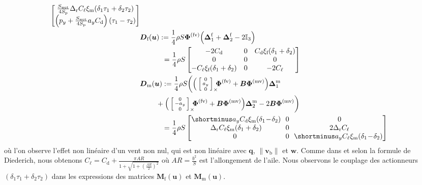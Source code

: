 \begin{align}
\begin{bmatrix}
   \frac{S_{\text{wet}}}{4S_{\text{p}}} \Delta_{\text{r}}C_{\ell}\xi_{\text{m}}(\delta_{1}\tau_{1} + \delta_{2}\tau_{2}) \\
   \left(p_{y}+\frac{S_{\text{wet}}}{4S_{\text{p}}} a_{y} C_{\text{d}}\right)(\tau_{1} - \tau_{2})
   \end{bmatrix} \\
    \label{eq:df}
             &\boldsymbol{D}_{\text{f}}(\boldsymbol{u}) :=  \frac{1}{4} \rho S  \boldsymbol{\Phi}^{\text{(fv)}} \Big( \boldsymbol{\Delta}^{\text{f}}_1+  \boldsymbol{\Delta}^{\text{f}}_2 - 2 \mathbb{I}_{3} \Big)   \\
            &\hspace*{1.1cm} = \frac{1}{4}\rho S  \begin{bmatrix}
                -2C_{\text{d}} & 0 & C_{\text{d}}\xi_{\text{f}}(\delta_{1} +\delta_{2})\\
                0 & 0 & 0\\
                -C_{\ell}\xi_{\text{f}}(\delta_{1} +\delta_{2}) & 0 & -2C_{\ell}
            \end{bmatrix} \nonumber \\
      \label{eq:dm}      
      & \boldsymbol{D}_{\text{m}}(\boldsymbol{u}) := \frac{1}{4} \rho S  \bigg( \Big(\skewsym{\smallm{0 \\ a_y \\ 0}} \!\!\!  \boldsymbol{\Phi}^{\text{(fv)}}  +  \boldsymbol{B}  \boldsymbol{\Phi}^{\text{(mv)}} \Big)  \boldsymbol{\Delta}^{\text{m}}_1  \\
       &\hspace{0.8cm}  + \Big( \skewsym{\smallm{0 \\ -a_y \\ 0}} \!\!\!  \boldsymbol{\Phi}^{\text{(fv)}} +  \boldsymbol{B}  \boldsymbol{\Phi}^{\text{(mv)}}  \Big)  \boldsymbol{\Delta}^{\text{m}}_2 - 2  \boldsymbol{B}  \boldsymbol{\Phi}^{\text{(mv)}}  \bigg) \nonumber \\
       \nonumber
         & \hspace*{1.1cm} = \frac{1}{4}\rho S  \begin{bmatrix}
                \shortminus a_{y}C_{\text{d}}\xi_{\text{m}}(\delta_{1} \!-\! \delta_{2}) \!\! & 0 & 0\\
                \Delta_{\text{r}}C_{\ell}\xi_{\text{m}}(\delta_{1} +\delta_{2})\!\! & 0 & 2\Delta_{\text{r}}C_{\ell}\\
               0 & 0 & \!\! \shortminus a_{y}C_{\ell}\xi_{\text{m}}(\delta_{1} \!-\!\delta_{2})
            \end{bmatrix} 
    \end{align}
où l'on observe l'effet non linéaire d'un vent non nul, qui est non linéaire avec $\boldsymbol{q}$, $\lVert \boldsymbol{v}_{\text{b}} \rVert$ et $\boldsymbol{w}$. Comme dans \cite[eqn. (10)]{olszaneckibarthHal-02542982} et selon la formule de Diederich, nous obtenons $C_{\ell} = C_{\text{d}} + \frac{\pi AR}{1+\sqrt{1+\left(\frac{AR}{2}\right)^{2}}}$ où $AR = \frac{b^{2}}{S}$ est l'allongement de l'aile.
Nous observons le couplage des actionneurs $\left(\delta_{1}\tau_{1} + \delta_{2}\tau_{2}\right)$  dans les expressions des matrices $\boldsymbol{M}_{\text{f}}(\boldsymbol{u})$ et $\boldsymbol{M}_{\text{m}}(\boldsymbol{u})$.

